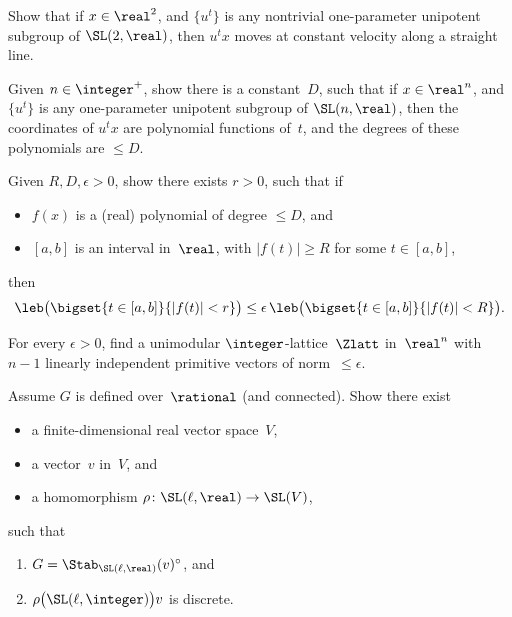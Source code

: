 \begin{exercises}
\item \label{UnipOrbIsLine}
Show that if $x \in \real^2$, and $\{u^t\}$ is any nontrivial one-parameter unipotent subgroup of $\SL(2,\real)$, then $u^t x$ moves at constant velocity along a straight line.

\item \label{UnipOrbsArePoly}
Given $n \in \integer^+$, show there is a constant~$D$, such that
if $x \in \real^n$, and $\{u^t\}$ is any one-parameter unipotent subgroup of $\SL(n,\real)$, then the coordinates of $u^t x$ are polynomial functions of~$t$, and the degrees of these polynomials are $\le D$.

\item \label{PolySpendsLittleTimeSmall}
Given $R, D, \epsilon > 0$, show there exists $r > 0$, such that if
	\begin{itemize}
	\item $f(x)$ is a (real) polynomial of degree $\le D$,
	and
	\item $[a,b]$ is an interval in~$\real$, with $|f(t)| \ge R$ for some $t \in [a,b]$,
	\end{itemize}
then
	$$ \leb \bigl( \bigset{ t \in [a,b] }{ |f(t)| < r } \bigr) 
		\le \epsilon \, \leb \bigl( \bigset{ t \in [a,b] }{ |f(t)| < R } \bigr) . $$

\item \label{UnimodLattCanHaveLotsSmallVectors}
For every $\epsilon > 0$, find a unimodular $\integer$-lattice~$\Zlatt$ in~$\real^n$ with $n-1$ linearly independent primitive vectors of norm~$\le \epsilon$.

\item \label{ChevalleyStabDiscreteZ}
Assume $G$ is defined over~$\rational$ (and connected).
Show there exist
	\begin{itemize}
	\item a finite-dimensional real vector space~$V$, 
	\item a vector~$v$ in~$V$,
	and
	\item a homomorphism $\rho \colon \SL(\ell,\real) \to \SL(V)$,
	\end{itemize}
such that 
	\begin{enumerate}
	\item $G = \Stab_{\SL(\ell,\real)}(v)^\circ$,
	and 
	\item $\rho \bigl( \SL(\ell,\integer) \bigr) v$ is discrete.
	\end{enumerate}


\end{exercises}
